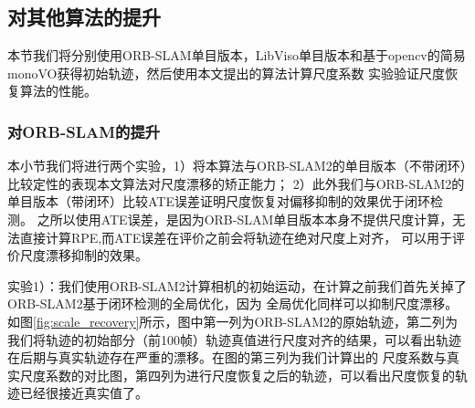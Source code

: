 \subsection{对其他算法的提升}
本节我们将分别使用ORB-SLAM单目版本，LibViso单目版本和基于opencv的简易monoVO获得初始轨迹，然后使用本文提出的算法计算尺度系数
实验验证尺度恢复算法的性能。
\subsubsection{对ORB-SLAM的提升}
\label{sec:eva_scale_recovery}
本小节我们将进行两个实验，1）将本算法与ORB-SLAM2的单目版本（不带闭环）比较定性的表现本文算法对尺度漂移的矫正能力；
2）此外我们与ORB-SLAM2的单目版本（带闭环）比较ATE误差证明尺度恢复对偏移抑制的效果优于闭环检测。
之所以使用ATE误差，是因为ORB-SLAM单目版本本身不提供尺度计算，无法直接计算RPE,而ATE误差在评价之前会将轨迹在绝对尺度上对齐，
可以用于评价尺度漂移抑制的效果。

实验1）：我们使用ORB-SLAM2计算相机的初始运动，在计算之前我们首先关掉了ORB-SLAM2基于闭环检测的全局优化，因为
全局优化同样可以抑制尺度漂移。如图\ref{fig:scale_recovery}所示，图中第一列为ORB-SLAM2的原始轨迹，第二列为
我们将轨迹的初始部分（前100帧）轨迹真值进行尺度对齐的结果，可以看出轨迹在后期与真实轨迹存在严重的漂移。在图的第三列为我们计算出的
尺度系数与真实尺度系数的对比图，第四列为进行尺度恢复之后的轨迹，可以看出尺度恢复的轨迹已经很接近真实值了。

